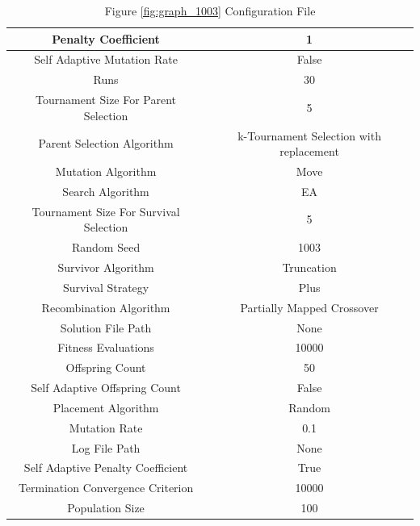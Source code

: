 \documentclass{standalone}
\begin{document}
\begin{table}[!htb]
	\centering
	\caption{Figure \ref{fig:graph_1003} Configuration File}
	\label{tab:graph_1003}
	\begin{tabular}{| c | c |}
		\hline
		Penalty Coefficient		& 1		 \\
		\hline
		Self Adaptive Mutation Rate		& False		 \\
		\hline
		Runs		& 30		 \\
		\hline
		Tournament Size For Parent Selection		& 5		 \\
		\hline
		Parent Selection Algorithm		& k-Tournament Selection with replacement		 \\
		\hline
		Mutation Algorithm		& Move		 \\
		\hline
		Search Algorithm		& EA		 \\
		\hline
		Tournament Size For Survival Selection		& 5		 \\
		\hline
		Random Seed		& 1003		 \\
		\hline
		Survivor Algorithm		& Truncation		 \\
		\hline
		Survival Strategy		& Plus		 \\
		\hline
		Recombination Algorithm		& Partially Mapped Crossover		 \\
		\hline
		Solution File Path		& None		 \\
		\hline
		Fitness Evaluations		& 10000		 \\
		\hline
		Offspring Count		& 50		 \\
		\hline
		Self Adaptive Offspring Count		& False		 \\
		\hline
		Placement Algorithm		& Random		 \\
		\hline
		Mutation Rate		& 0.1		 \\
		\hline
		Log File Path		& None		 \\
		\hline
		Self Adaptive Penalty Coefficient		& True		 \\
		\hline
		Termination Convergence Criterion		& 10000		 \\
		\hline
		Population Size		& 100		 \\
		\hline
	\end{tabular}
\end{table}
\end{document}
